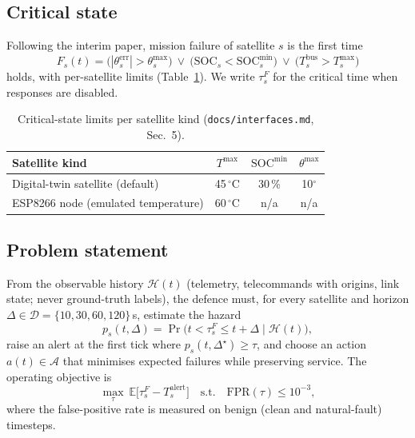 \documentclass[conference]{IEEEtran}
\newcommand{\file}[1]{\texttt{#1}}
\newcommand{\degC}{$^{\circ}$C}
\begin{document}
\subsection{Critical state}
Following the interim paper, mission failure of satellite $s$ is the first time
\begin{equation}
F_s(t) = \big(|\theta^{\mathrm{err}}_s| > \theta^{\max}_s\big)\ \vee\
\big(\mathrm{SOC}_s < \mathrm{SOC}^{\min}_s\big)\ \vee\ \big(T^{\mathrm{bus}}_s > T^{\max}_s\big)
\label{eq:F}
\end{equation}
holds, with per-satellite limits (Table~\ref{tab:limits}). We write $\tau^F_s$ for the critical time
when responses are disabled.

\begin{table}[t]
\caption{Critical-state limits per satellite kind (\file{docs/interfaces.md}, Sec.~5).}
\label{tab:limits}
\centering
\footnotesize
\begin{tabular}{@{}lccc@{}}
\toprule
Satellite kind & $T^{\max}$ & $\mathrm{SOC}^{\min}$ & $\theta^{\max}$ \\
\midrule
Digital-twin satellite (default) & 45\,\degC & 30\,\% & 10$^{\circ}$ \\
ESP8266 node (emulated temperature) & 60\,\degC & n/a & n/a \\
\bottomrule
\end{tabular}
\end{table}

\subsection{Problem statement}
From the observable history $\mathcal{H}(t)$ (telemetry, telecommands with origins, link state; never
ground-truth labels), the defence must, for every satellite and horizon
$\Delta\in\mathcal{D}=\{10,30,60,120\}$\,s, estimate the hazard
\begin{equation}
p_s(t,\Delta) = \Pr\big(t < \tau^F_s \le t+\Delta \;\big|\; \mathcal{H}(t)\big),
\label{eq:hazard-goal}
\end{equation}
raise an alert at the first tick where $p_s(t,\Delta^\star)\ge\tau$, and choose an action
$a(t)\in\mathcal{A}$ that minimises expected failures while preserving service. The operating
objective is
\begin{equation}
\max_{\tau}\ \mathbb{E}\big[\tau^F_s - T^{\mathrm{alert}}_s\big]
\quad \text{s.t.}\quad \mathrm{FPR}(\tau)\le 10^{-3},
\label{eq:objective}
\end{equation}
where the false-positive rate is measured on benign (clean and natural-fault) timesteps.
\end{document}
